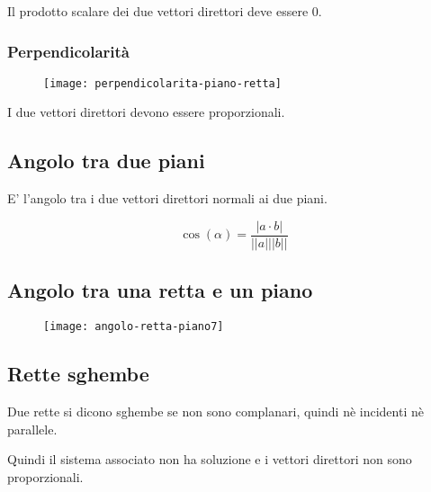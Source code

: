 Il prodotto scalare dei due vettori direttori deve essere 0.

\subsubsection{Perpendicolarità}

\begin{figure}[H]
\texttt{[image: perpendicolarita-piano-retta]}
\centering
\end{figure}

I due vettori direttori devono essere proporzionali.


\subsection{Angolo tra due piani}

E' l'angolo tra i due vettori direttori normali ai due piani.

$$\cos(\alpha) = \frac{|a \cdot b|}{||a|||b||}$$


\subsection{Angolo tra una retta e un piano}

\begin{figure}[H]
\texttt{[image: angolo-retta-piano7]}
\centering
\end{figure}

\subsection{Rette sghembe}
Due rette si dicono sghembe se non sono complanari, quindi nè incidenti nè parallele.

Quindi il sistema associato non ha soluzione e i vettori direttori non sono proporzionali.